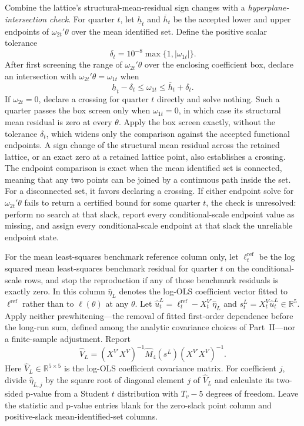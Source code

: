 \documentclass[11pt]{article}
\begin{document}
Combine the lattice's structural-mean-residual sign changes with a
\emph{hyperplane-intersection check}. For quarter \(t\), let \(\underline h_t\) and \(\overline h_t\)
be the accepted lower and upper endpoints of \(\omega_{2t}'\theta\) over the mean identified set. Define
the positive scalar tolerance
\begin{equation*}
 \delta_t=10^{-8}\max\{1,|\omega_{1t}|\}.
\end{equation*}
After first screening the range of \(\omega_{2t}'\theta\) over the enclosing coefficient box, declare an
intersection with \(\omega_{2t}'\theta=\omega_{1t}\) when
\begin{equation*}
 \underline h_t-\delta_t\le \omega_{1t}\le\overline h_t+\delta_t.
\end{equation*}
If \(\omega_{2t}=0\), declare a crossing for quarter \(t\) directly and solve nothing. Such a quarter
passes the box screen only when \(\omega_{1t}=0\), in which case its structural mean residual is zero at
every \(\theta\).
Apply the box screen exactly, without the tolerance \(\delta_t\), which widens only the comparison
against the accepted functional endpoints. A sign change of the structural mean residual across the
retained lattice, or an exact zero at a retained lattice point, also establishes a crossing. The
endpoint comparison is exact when the mean
identified set is connected, meaning that any two points can be joined by a continuous path inside
the set. For a disconnected set, it favors declaring a crossing. If either endpoint solve for
\(\omega_{2t}'\theta\) fails to return a certified bound for some quarter \(t\), the check is unresolved:
perform no search at that slack, report every conditional-scale endpoint value as missing, and
assign every conditional-scale endpoint at that slack the unreliable endpoint state.

For the mean least-squares benchmark reference column only, let \(\ell_t^{\mathrm{ref}}\) be the
log squared mean least-squares benchmark residual for quarter \(t\) on the conditional-scale rows,
and stop the reproduction if any of those benchmark residuals is exactly zero. In this column
\(\widehat\eta_L\) denotes the log-OLS coefficient vector fitted to \(\ell^{\mathrm{ref}}\) rather
than to \(\ell(\theta)\) at any \(\theta\). Let
\(\widehat u_t^L=\ell_t^{\mathrm{ref}}-X_t^{V\prime}\widehat\eta_L\) and
\(s_t^L=X_t^V\widehat u_t^L\in\mathbb R^5\). Apply neither prewhitening---the removal of fitted
first-order dependence before the long-run sum, defined among the analytic covariance choices of
Part~II---nor a finite-sample adjustment.
Report
\[
 \widehat V_L=(X^{V\prime}X^V)^{-1}\widehat M_4(s^L)
 (X^{V\prime}X^V)^{-1}.
\]
Here \(\widehat V_L\in\mathbb R^{5\times5}\) is the log-OLS coefficient covariance matrix.
For coefficient \(j\), divide \(\widehat\eta_{L,j}\) by the square root of diagonal element \(j\)
of \(\widehat V_L\) and calculate its two-sided p-value from a Student \(t\) distribution with
\(T_v-5\) degrees of freedom. Leave the statistic and p-value entries blank for the zero-slack point
column and positive-slack mean-identified-set columns.
\end{document}
